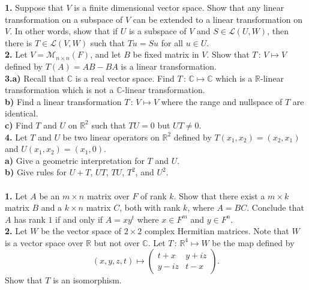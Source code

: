 \documentclass[11pt]{amsart}
\theoremstyle{definition}  %
\newcommand{\R}{\mathbb{R}}
\newcommand{\C}{\mathbb{C}}
\begin{document}

\noindent
{\bf 1.} Suppose that $V$ is a finite dimensional vector space. Show that any linear transformation on a subspace of $V$ can be extended to a 
linear transformation on $V$. In other words, show that if $U$ is a subspace of $V$ and $S \in \mathcal{L}(U,W)$, then there is 
$T \in \mathcal{L}(V,W)$ such that $Tu = Su$ for all $u \in U$. \\

\vskip 0.1cm
\noindent
{\bf 2.} Let $V = \mathcal{M}_{n \times n}(F)$, and let $B$ be fixed matrix in $V$. Show that $T \, : \, V \mapsto V$ defined by
$T(A) = AB-BA$ is a linear transformation. \\

\vskip 0.1cm
\noindent
{\bf 3.a)} Recall that $\C$ is a real vector space. Find $T \, : \, \C \mapsto \C$ which is a $\R$-linear transformation which is not a 
$\C$-linear transformation. \\
{\bf b)} Find a linear transformation $T \, : \, V \mapsto V$ where the range and nullspace of $T$ are identical. \\
{\bf c)} Find $T$ and $U$ on $\R^2$ such that $TU = 0$ but $UT \neq 0$. \\

\vskip 0.1cm
\noindent
{\bf 4.} Let $T$ and $U$ be two linear operators on $\R^2$ defined by $T(x_1, x_2) = (x_2,x_1)$ and $U(x_1,x_2) = (x_1,0)$. \\
{\bf a)} Give a geometric interpretation for $T$ and $U$. \\
{\bf b)} Give rules for $U+T$, $UT$, $TU$, $T^2$, and $U^2$. \\





\vfill
\eject
{}\\
{\bf 1.} Let $A$ be an $m \times n$ matrix over $F$ of rank $k$. Show that there exist a $m \times k$ matrix $B$ and a
$k \times n$ matrix $C$, both with rank $k$, where $A = BC$. Conclude that $A$ has rank $1$ if and only if $A = xy^t$ where
$x \in F^m$ and $y \in F^n$. \\


\vskip 0.1cm
\noindent 
{\bf 2.} Let $W$ be the vector space of $2 \times 2$ complex Hermitian matrices. Note that $W$ is a vector space over $\R$ but not
over $\C$. Let $T \, : \, \R^4 \mapsto W$ be the map defined by 
$$ (x,y,z,t) \mapsto \left( \begin{array}{cc} t +x & y + iz \\ y - iz & t -x \end{array} \right).$$
Show that $T$ is an isomorphism. \\
\end{document}
